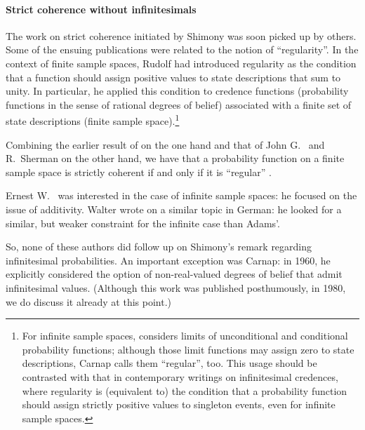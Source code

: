 \paragraph{Strict coherence without infinitesimals}
The work on strict coherence initiated by Shimony was soon picked up by others. Some of the ensuing publications were related to the notion of ``regularity''. In the context of finite sample spaces, Rudolf \citet[ch.~5]{Carnap:1950} had introduced regularity as the condition that a function should assign positive values to state descriptions that sum to unity. In particular, he applied this condition to credence functions (probability functions in the sense of rational degrees of belief) associated with a finite set of state descriptions (finite sample space).\footnote{For infinite sample spaces, \citet{Carnap:1950} considers limits of unconditional and conditional probability functions; although those limit functions may assign zero to state descriptions, Carnap calls them ``regular'', too. This usage should be contrasted with that in contemporary writings on infinitesimal credences, where regularity is (equivalent to) the condition that a probability function should assign strictly positive values to singleton events, even for infinite sample spaces.}

Combining the earlier result of \citet{Shimony:1955} on the one hand and that of John G.~\citet{Kemeny:1955} and R.~Sherman \citet{Lehman:1955} on the other hand, we have that a probability function on a finite sample space is strictly coherent if and only if it is ``regular'' \citep[\textit{cf}.][p.~15]{Carnap:1971a}.

Ernest W.~\citet{Adams:1959,Adams:1962,Adams:1964} was interested in the case of infinite sample spaces: he focused on the issue of  additivity. Walter \citet{Oberschelp:1962} wrote on a similar topic in German: he looked for a similar, but weaker constraint for the infinite case than Adams'.

So, none of these authors did follow up on Shimony's remark regarding infinitesimal probabilities.
An important exception was Carnap: in 1960, he explicitly considered the option of non-real-valued degrees of belief that admit infinitesimal values. (Although this work was published posthumously, in 1980, we do discuss it already at this point.)

